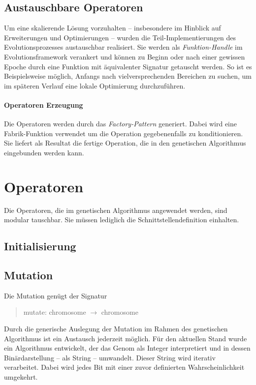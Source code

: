 \documentclass[12pt,a4paper]{scrartcl}
\begin{document}
\subsection{Austauschbare Operatoren}
Um eine skalierende Lösung vorzuhalten -- insbesondere im Hinblick auf Erweiterungen und Optimierungen -- wurden die Teil-Implementierungen des Evolutionsprozesses austauschbar realisiert. Sie werden als \emph{Funktion-Handle} im Evolutionsframework verankert und können zu Beginn oder nach einer gewissen Epoche durch eine Funktion mit äquivalenter Signatur getauscht werden. So ist es Beispielsweise möglich, Anfangs nach vielversprechenden Bereichen zu suchen, um im späteren Verlauf eine lokale Optimierung durchzuführen.

\paragraph{Operatoren Erzeugung} Die Operatoren werden durch das \emph{Factory-Pattern} generiert. Dabei wird eine Fabrik-Funktion verwendet um die Operation gegebenenfalls zu konditionieren. Sie liefert als Resultat die fertige Operation, die in den genetischen Algorithmus eingebunden werden kann.

\section{Operatoren}
Die Operatoren, die im genetischen Algorithmus angewendet werden, sind modular tauschbar. Sie müssen lediglich die Schnittstellendefinition einhalten.
\subsection{Initialisierung}

\subsection{Mutation}
Die Mutation genügt der Signatur
\begin{quote}
 \textsf{mutate: chromosome $\rightarrow$ chromosome}
\end{quote}
Durch die generische Auslegung der Mutation im Rahmen des genetischen Algorithmus ist ein Austausch jederzeit möglich. Für den aktuellen Stand wurde ein Algorithmus entwickelt, der das Genom als Integer interpretiert und in dessen Binärdarstellung -- als String -- umwandelt. Dieser String wird iterativ verarbeitet. Dabei wird jedes Bit mit einer zuvor definierten Wahrscheinlichkeit umgekehrt.
\end{document}
